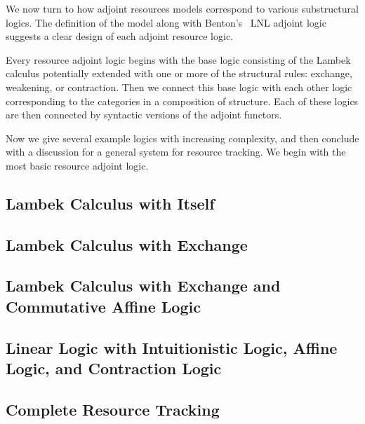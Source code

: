We now turn to how adjoint resources models correspond to various
substructural logics.  The definition of the model along with
Benton's~\cite{Benton:1994} LNL adjoint logic suggests a clear design
of each adjoint resource logic.

Every resource adjoint logic begins with the base logic consisting of
the Lambek calculus potentially extended with one or more of the
structural rules: exchange, weakening, or contraction.  Then we
connect this base logic with each other logic corresponding to the
categories in a composition of structure.  Each of these logics are
then connected by syntactic versions of the adjoint functors.

Now we give several example logics with increasing complexity, and
then conclude with a discussion for a general system for resource
tracking.  We begin with the most basic resource adjoint logic.

\subsection{Lambek Calculus with Itself}
\label{subsec:lambek_calculus_with_itself}


\subsection{Lambek Calculus with Exchange}
\label{subsec:lambek_calculus_with_exchange}


\subsection{Lambek Calculus with Exchange and Commutative Affine Logic}
\label{subsec:linear_logic_with_affine_logic}


\subsection{Linear Logic with Intuitionistic Logic, Affine Logic, and Contraction Logic}
\label{subsec:linear_logic_with_affine_logic_and_contraction_logic}


\subsection{Complete Resource Tracking}
\label{subsec:complete_resource_tracking}


